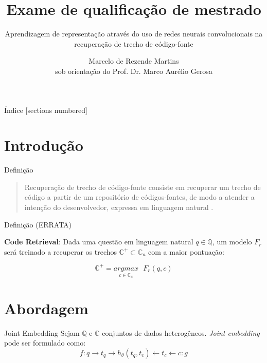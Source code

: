 \documentclass[10pt]{beamer}
\title{Exame de qualificação de mestrado}
\subtitle{Aprendizagem de representação através do uso de redes neurais convolucionais na recuperação de trecho de código-fonte}
\date{}
\author{Marcelo de Rezende Martins\\{\footnotesize sob orientação do Prof. Dr. Marco Aurélio Gerosa}}
\institute{Instituto de Pesquisas Tecnológicas do Estado de São Paulo - IPT}
\begin{document}
\maketitle

\begin{frame}{Índice}
  [sections numbered]
  \tableofcontents%
\end{frame}

\section[Intro]{Introdução}


\begin{frame}[fragile]{Definição}

\begin{quote}
Recuperação de trecho de código-fonte consiste em recuperar um trecho de código a partir de um repositório de códigos-fontes, de modo a atender a intenção do desenvolvedor, expressa em linguagem natural \cite{cambronero-deep-learning-code-search:2019, Gu-deep-code-search:2018}.     
\end{quote}


\end{frame}
\begin{frame}[fragile]{Definição (ERRATA)}

  \textbf{Code Retrieval}: Dada uma questão em linguagem natural $q \in \mathbb{Q}$, um modelo $F_{r}$ será treinado a recuperar os trechos $\mathbb{C}^{+} \subset \mathbb{C}_{a}$ com a maior pontuação:

\begin{equation}\label{eq:code-retrieval}
\mathbb{C}^{+} = \underset{c \in \mathbb{C}_{a}}{argmax}\text{ } F_{r}(q , c)
\end{equation}
\end{frame}


\section{Abordagem}

\begin{frame}{Joint Embedding}
    Sejam $\mathbb{Q}$ e $\mathbb{C}$ conjuntos de dados heterogêneos. \textit{Joint embedding} pode ser formulado como:
	\begin{equation}
        f: q \rightarrow t_{q} \rightarrow h_{\theta}(t_{q}, t_{c}) \leftarrow t_{c} \leftarrow c :g
    \end{equation}
\end{frame}
\end{document}
